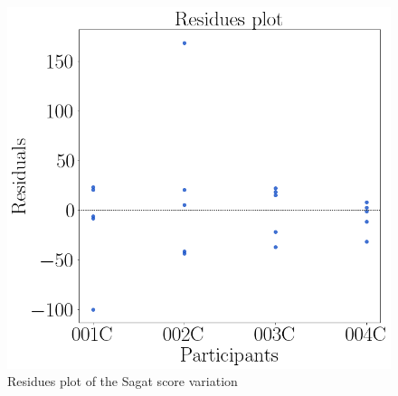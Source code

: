 \begin{figure}[!htb]
\begin{minipage}{0.45\linewidth}
        \includegraphics[width = \linewidth]{Resultados/ECG/Figuras/png/residplot_sdnn.png}
        \caption{Residues plot of the Sagat score variation}
        \label{fig:residual_sagat_var}
    \end{minipage}
\end{figure}

\FloatBarrier